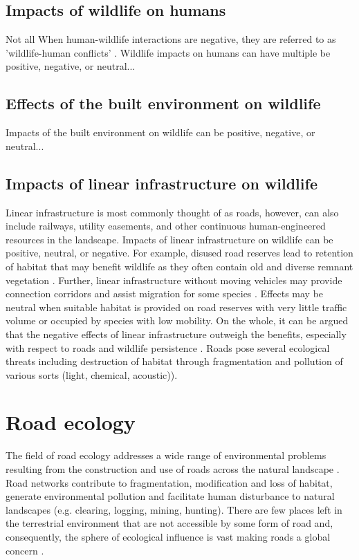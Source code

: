 \subsection{Impacts of wildlife on humans}

Not all 
When human-wildlife interactions are negative, they are referred to as 'wildlife-human conflicts' \citep{}.  Wildlife impacts on humans can have multiple be positive, negative, or neutral...

\subsection{Effects of the built environment on wildlife}

Impacts of the built environment on wildlife can be positive, negative, or neutral...

\subsection{Impacts of linear infrastructure on wildlife}

Linear infrastructure is most commonly thought of as roads, however, can also include railways, utility easements, and other continuous human-engineered resources in the landscape. Impacts of linear infrastructure on wildlife can be positive, neutral, or negative. For example, disused road reserves lead to retention of habitat that may benefit wildlife as they often contain old and diverse remnant vegetation \citep{benne91}. Further, linear infrastructure without moving vehicles may provide connection corridors and assist migration for some species \citep{rvdr15}. Effects may be neutral when suitable habitat is provided on road reserves with very little traffic volume or occupied by species with low mobility. On the whole, it can be argued that the negative effects of linear infrastructure outweigh the benefits, especially with respect to roads and wildlife persistence \citep{fahr09}. Roads pose several ecological threats including destruction of habitat through fragmentation and pollution of various sorts (light, chemical, acoustic)).

\section{Road ecology}

The field of road ecology addresses a wide range of environmental problems resulting from the construction and use of roads across the natural landscape \citep{form03,rvdr15}. Road networks contribute to fragmentation, modification and loss of habitat, generate environmental pollution and facilitate human disturbance to natural landscapes (e.g. clearing, logging, mining, hunting). There are few places left in the terrestrial environment that are not accessible by some form of road and, consequently, the sphere of ecological influence is vast making roads a global concern \citep{laur14}.

